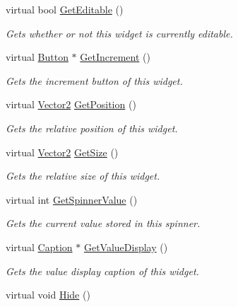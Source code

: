\begin{DoxyCompactItemize}
virtual bool \hyperlink{classphys_1_1UI_1_1Spinner_a32005fcea4898c07cd469aa70cad3016}{GetEditable} ()
\begin{DoxyCompactList}\small\item\em Gets whether or not this widget is currently editable. \item\end{DoxyCompactList}\item 
virtual \hyperlink{classphys_1_1UI_1_1Button}{Button} $\ast$ \hyperlink{classphys_1_1UI_1_1Spinner_a2263f427c90b21a208bf0a6bfb3d2201}{GetIncrement} ()
\begin{DoxyCompactList}\small\item\em Gets the increment button of this widget. \item\end{DoxyCompactList}\item 
virtual \hyperlink{classphys_1_1Vector2}{Vector2} \hyperlink{classphys_1_1UI_1_1Spinner_a0cfed1bd9532351eac373b0f23495225}{GetPosition} ()
\begin{DoxyCompactList}\small\item\em Gets the relative position of this widget. \item\end{DoxyCompactList}\item 
virtual \hyperlink{classphys_1_1Vector2}{Vector2} \hyperlink{classphys_1_1UI_1_1Spinner_a670d8ff577a8feb6df6f507843f08756}{GetSize} ()
\begin{DoxyCompactList}\small\item\em Gets the relative size of this widget. \item\end{DoxyCompactList}\item 
virtual int \hyperlink{classphys_1_1UI_1_1Spinner_ae08a2762eb31aa28fcccf044973a2395}{GetSpinnerValue} ()
\begin{DoxyCompactList}\small\item\em Gets the current value stored in this spinner. \item\end{DoxyCompactList}\item 
virtual \hyperlink{classphys_1_1UI_1_1Caption}{Caption} $\ast$ \hyperlink{classphys_1_1UI_1_1Spinner_a65497e1c3cb290172dfedcb6ecbc9e8f}{GetValueDisplay} ()
\begin{DoxyCompactList}\small\item\em Gets the value display caption of this widget. \item\end{DoxyCompactList}\item 
\hypertarget{classphys_1_1UI_1_1Spinner_adcf8000c6d6eea51b52bac0d7f05bfd2}{
virtual void \hyperlink{classphys_1_1UI_1_1Spinner_adcf8000c6d6eea51b52bac0d7f05bfd2}{Hide} ()}
\label{classphys_1_1UI_1_1Spinner_adcf8000c6d6eea51b52bac0d7f05bfd2}


\end{DoxyCompactItemize}
